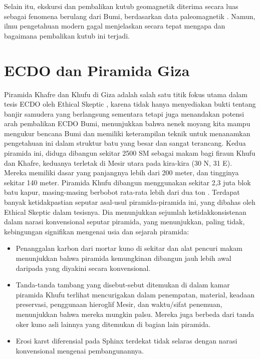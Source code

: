\documentclass[10pt,twocolumn,letterpaper]{article}
\begin{document}
Selain itu, ekskursi dan pembalikan kutub geomagnetik diterima secara luas sebagai fenomena berulang dari Bumi, berdasarkan data paleomagnetik \cite{35,40,41}. Namun, ilmu pengetahuan modern gagal menjelaskan secara tepat mengapa dan bagaimana pembalikan kutub ini terjadi.

\section{ECDO dan Piramida Giza}

Piramida Khafre dan Khufu di Giza adalah salah satu titik fokus utama dalam tesis ECDO oleh Ethical Skeptic \cite{27}, karena tidak hanya menyediakan bukti tentang banjir samudera yang berlangsung sementara tetapi juga menandakan potensi arah pembalikan ECDO Bumi, menunjukkan bahwa nenek moyang kita mampu mengukur bencana Bumi dan memiliki keterampilan teknik untuk menanamkan pengetahuan ini dalam struktur batu yang besar dan sangat terancang. Kedua piramida ini, diduga dibangun sekitar 2500 SM sebagai makam bagi firaun Khufu dan Khafre, keduanya terletak di Mesir utara pada kira-kira (30 N, 31 E). Mereka memiliki dasar yang panjangnya lebih dari 200 meter, dan tingginya sekitar 140 meter. Piramida Khufu dibangun menggunakan sekitar 2,3 juta blok batu kapur, masing-masing berbobot rata-rata lebih dari dua ton \cite{24, 25}.
Terdapat banyak ketidakpastian seputar asal-usul piramida-piramida ini, yang dibahas oleh Ethical Skeptic dalam tesisnya. Dia menunjukkan sejumlah ketidakkonsistenan dalam narasi konvensional seputar piramida, yang menunjukkan, paling tidak, kebingungan signifikan mengenai usia dan sejarah piramida:

\begin{flushleft}
\begin{itemize}
    \item Penanggalan karbon dari mortar kuno di sekitar dan alat pencuri makam menunjukkan bahwa piramida kemungkinan dibangun jauh lebih awal daripada yang diyakini secara konvensional.
    \item Tanda-tanda tambang yang disebut-sebut ditemukan di dalam kamar piramida Khufu terlihat mencurigakan dalam penempatan, material, keadaan preservasi, penggunaan hieroglif Mesir, dan waktu/sifat penemuan, menunjukkan bahwa mereka mungkin palsu. Mereka juga berbeda dari tanda oker kuno asli lainnya yang ditemukan di bagian lain piramida.
    \item Erosi karst diferensial pada Sphinx terdekat tidak selaras dengan narasi konvensional mengenai pembangunannya.
\end{itemize}
\end{flushleft}
\end{document}
